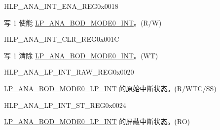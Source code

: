 \begin{register}{H}{LP\_ANA\_INT\_ENA\_REG}{0x0018}\label{regdesc:LPANAINTENAREG}
%
%
\regnewline%
\begin{regdesc}\begin{reglist}
\label{fielddesc:LPANABODMODE0INTENA}\item [LP\_ANA\_BOD\_MODE0\_INT\_ENA] 写 1 使能 \hyperref[int:LPANABODMODE0INT]{LP\_ANA\_BOD\_MODE0\_INT}。(R/W)
\end{reglist}\end{regdesc}
\end{register}

\begin{register}{H}{LP\_ANA\_INT\_CLR\_REG}{0x001C}\label{regdesc:LPANAINTCLRREG}
%
%
\regnewline%
\begin{regdesc}\begin{reglist}
\label{fielddesc:LPANABODMODE0INTCLR}\item [LP\_ANA\_BOD\_MODE0\_INT\_CLR] 写 1 清除 \hyperref[int:LPANABODMODE0INT]{LP\_ANA\_BOD\_MODE0\_INT}。(WT)
\end{reglist}\end{regdesc}
\end{register}

\begin{register}{H}{LP\_ANA\_LP\_INT\_RAW\_REG}{0x0020}\label{regdesc:LPANALPINTRAWREG}
%
%
\regnewline%
\begin{regdesc}\begin{reglist}
\label{fielddesc:LPANABODMODE0LPINTRAW}\item [LP\_ANA\_BOD\_MODE0\_LP\_INT\_RAW] \hyperref[int:LPANABODMODE0LPINT]{LP\_ANA\_BOD\_MODE0\_LP\_INT} 的原始中断状态。(R/WTC/SS)
\end{reglist}\end{regdesc}
\end{register}

\begin{register}{H}{LP\_ANA\_LP\_INT\_ST\_REG}{0x0024}\label{regdesc:LPANALPINTSTREG}%
%
\regnewline%
\begin{regdesc}\begin{reglist}
\label{fielddesc:LPANABODMODE0LPINTST}\item [LP\_ANA\_BOD\_MODE0\_LP\_INT\_ST] \hyperref[int:LPANABODMODE0LPINT]{LP\_ANA\_BOD\_MODE0\_LP\_INT} 的屏蔽中断状态。(RO)
\end{reglist}\end{regdesc}
\end{register}

